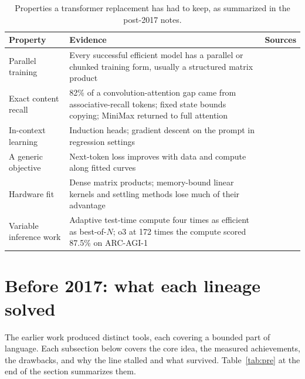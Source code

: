 \begin{table}[ht]
\centering\small
\begin{tabular}{p{3.6cm}p{7.4cm}p{2.6cm}}
\toprule
Property & Evidence & Sources \\
\midrule
Parallel training & Every successful efficient model has a parallel or chunked training form, usually a structured matrix product & \cite{post1,post3,post5,post7} \\
Exact content recall & 82\% of a convolution-attention gap came from associative-recall tokens; fixed state bounds copying; MiniMax returned to full attention & \cite{post15,post16,post14} \\
In-context learning & Induction heads; gradient descent on the prompt in regression settings & \cite{post90,post91} \\
A generic objective & Next-token loss improves with data and compute along fitted curves & \cite{pre53,pre54} \\
Hardware fit & Dense matrix products; memory-bound linear kernels and settling methods lose much of their advantage & \cite{post14,post43} \\
Variable inference work & Adaptive test-time compute four times as efficient as best-of-$N$; o3 at 172 times the compute scored 87.5\% on ARC-AGI-1 & \cite{post93,post52} \\
\bottomrule
\end{tabular}
\caption{Properties a transformer replacement has had to keep, as summarized in the post-2017 notes.}
\label{tab:keep}
\end{table}

\section{Before 2017: what each lineage solved}
\label{sec:pre}
The earlier work produced distinct tools, each covering a bounded part of language. Each subsection below covers the core idea, the measured achievements, the drawbacks, and why the line stalled and what survived. Table~\ref{tab:pre} at the end of the section summarizes them.

